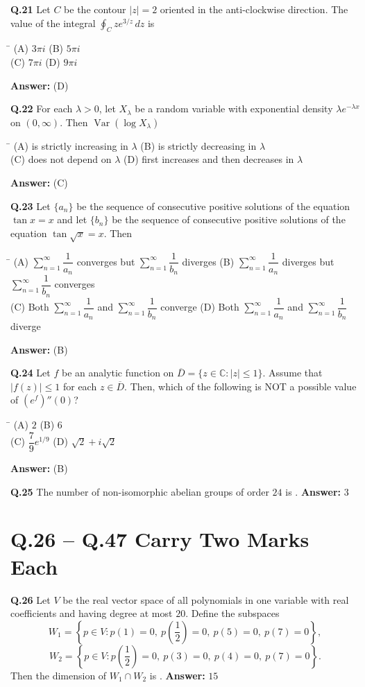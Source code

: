 \documentclass[11pt,a4paper]{article}
\newcommand{\optsfourA}[4]{%
  \begin{tabbing}
    \hspace{0.48\linewidth}\=\kill
    (A) #1 \> (B) #2 \\[2pt]
    (C) #3 \> (D) #4
  \end{tabbing}%
}
\newcommand{\ans}[1]{\textbf{Answer:} #1\par\medskip}
\begin{document}
\textbf{Q.21} Let $C$ be the contour $|z| = 2$ oriented in the anti-clockwise direction. The value of the integral $\displaystyle\oint_C z e^{3/z}\,dz$ is
\optsfourA{$3\pi i$}{$5\pi i$}{$7\pi i$}{$9\pi i$}
\ans{(D)}

\textbf{Q.22} For each $\lambda > 0$, let $X_\lambda$ be a random variable with exponential density $\lambda e^{-\lambda x}$ on $(0, \infty)$. Then $\operatorname{Var}(\log X_\lambda)$
\optsfourA{is strictly increasing in $\lambda$}{is strictly decreasing in $\lambda$}{does not depend on $\lambda$}{first increases and then decreases in $\lambda$}
\ans{(C)}

\textbf{Q.23} Let $\{a_n\}$ be the sequence of consecutive positive solutions of the equation $\tan x = x$ and let $\{b_n\}$ be the sequence of consecutive positive solutions of the equation $\tan\sqrt{x} = x$. Then
\optsfourA{$\sum_{n=1}^{\infty} \dfrac{1}{a_n}$ converges but $\sum_{n=1}^{\infty} \dfrac{1}{b_n}$ diverges}{$\sum_{n=1}^{\infty} \dfrac{1}{a_n}$ diverges but $\sum_{n=1}^{\infty} \dfrac{1}{b_n}$ converges}{Both $\sum_{n=1}^{\infty} \dfrac{1}{a_n}$ and $\sum_{n=1}^{\infty} \dfrac{1}{b_n}$ converge}{Both $\sum_{n=1}^{\infty} \dfrac{1}{a_n}$ and $\sum_{n=1}^{\infty} \dfrac{1}{b_n}$ diverge}
\ans{(B)}

\textbf{Q.24} Let $f$ be an analytic function on $\overline{D} = \{z \in \mathbb{C} : |z| \le 1\}$. Assume that $|f(z)| \le 1$ for each $z \in \overline{D}$. Then, which of the following is NOT a possible value of $(e^f)''(0)$?
\optsfourA{$2$}{$6$}{$\dfrac{7}{9}e^{1/9}$}{$\sqrt{2} + i\sqrt{2}$}
\ans{(B)}

\textbf{Q.25} The number of non-isomorphic abelian groups of order $24$ is \underline{\hspace{2cm}}.
\ans{$3$}

\section*{Q.26 -- Q.47 Carry Two Marks Each}

\textbf{Q.26} Let $V$ be the real vector space of all polynomials in one variable with real coefficients and having degree at most $20$. Define the subspaces
\[
  W_1 = \left\{p \in V : p(1) = 0,\ p\!\left(\frac{1}{2}\right) = 0,\ p(5) = 0,\ p(7) = 0\right\},
\]
\[
  W_2 = \left\{p \in V : p\!\left(\frac{1}{2}\right) = 0,\ p(3) = 0,\ p(4) = 0,\ p(7) = 0\right\}.
\]
Then the dimension of $W_1 \cap W_2$ is \underline{\hspace{2cm}}.
\ans{$15$}
\end{document}
